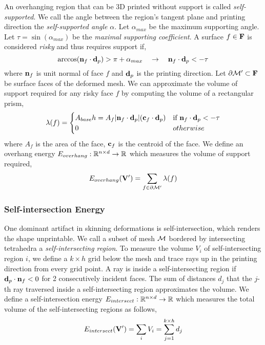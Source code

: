An overhanging region that can be 3D printed without support is called \textit{self-supported}. We call the angle between the region's tangent plane and printing direction the \textit{self-supported angle} $\alpha$. Let $\alpha_{max}$ be the maximum supporting angle. Let $\tau = \sin(\alpha_{max})$ be the \textit{maximal supporting coefficient}. A surface $f\in \mathbf{F}$ is considered \textit{risky} and thus requires support if,
\[
    \arccos(\mathbf{n}_f \cdot \mathbf{d}_{p}) > \pi + \alpha_{max}
    \quad \rightarrow \quad
    \mathbf{n}_f \cdot \mathbf{d}_{p} < - \tau
\]
where $\mathbf{n}_f$ is unit normal of face $f$ and $\mathbf{d}_{p}$ is the printing direction. Let $\partial \mathcal{M}' \subset \mathbf{F}$ be surface faces of the deformed mesh. We can approximate the volume of support required for any risky face $f$ by computing the volume of a rectangular prism,
\[
    \lambda(f) = 
    \begin{cases}
        A_{base} h = A_f |\mathbf{n}_f \cdot \mathbf{d}_{p}| (\mathbf{c}_f \cdot \mathbf{d}_{p}) & \text{if } \mathbf{n}_f \cdot \mathbf{d}_{p} < -\tau \\
        0 & otherwise \\
    \end{cases}
\]
where $A_f$ is the area of the face, $\mathbf{c}_f$ is the centroid of the face. We define an overhang energy $E_{overhang}: \mathbb{R}^{n\times d} \to \mathbb{R}$ which measures the volume of support required,
\[
    E_{overhang}(\mathbf{V}') = \sum_{f\in \partial \mathcal{M}'} \lambda(f)
\]

\subsubsection*{Self-intersection Energy}

One dominant artifact in skinning deformations is self-intersection, which renders the shape unprintable. We call a subset of mesh $\mathcal{M}$ bordered by intersecting tetrahedra a \textit{self-intersecting region}. To measure the volume $V_i$ of self-intersecting region $i$, we define a $k\times h$ grid below the mesh and trace rays up in the printing direction from every grid point. A ray is inside a self-intersecting region if $\mathbf{d}_{p} \cdot \mathbf{n}_f < 0$ for 2 consecutively incident faces. The sum of distances $d_j$ that the $j$-th ray traversed inside a self-intersecting region approximates the volume. We define a self-intersection energy $E_{intersect}: \mathbb{R}^{n\times d} \to \mathbb{R}$ which measures the total volume of the self-intersecting regions as follows,
\[
    E_{intersect}(\mathbf{V}') = \sum_i V_i = \sum_{j=1}^{k\times h} d_j
\]





